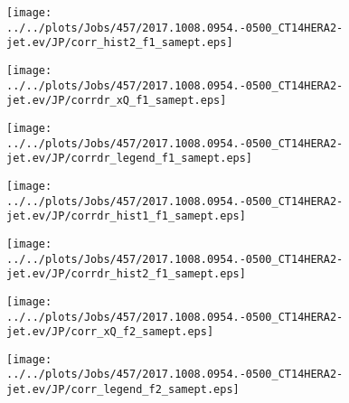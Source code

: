 \documentclass[12pt]{article}
\begin{document}
\begin{figure}
\texttt{[image: ../../plots/Jobs/457/2017.1008.0954.-0500\_CT14HERA2-jet.ev/JP/corr\_hist2\_f1\_samept.eps]}
\caption{}
\end{figure}\newpage\clearpage
\begin{figure}
\texttt{[image: ../../plots/Jobs/457/2017.1008.0954.-0500\_CT14HERA2-jet.ev/JP/corrdr\_xQ\_f1\_samept.eps]}
\caption{}
\end{figure}\newpage\clearpage
\begin{figure}
\texttt{[image: ../../plots/Jobs/457/2017.1008.0954.-0500\_CT14HERA2-jet.ev/JP/corrdr\_legend\_f1\_samept.eps]}
\caption{}
\end{figure}\newpage\clearpage
\begin{figure}
\texttt{[image: ../../plots/Jobs/457/2017.1008.0954.-0500\_CT14HERA2-jet.ev/JP/corrdr\_hist1\_f1\_samept.eps]}
\caption{}
\end{figure}\newpage\clearpage
\begin{figure}
\texttt{[image: ../../plots/Jobs/457/2017.1008.0954.-0500\_CT14HERA2-jet.ev/JP/corrdr\_hist2\_f1\_samept.eps]}
\caption{}
\end{figure}\newpage\clearpage
\begin{figure}
\texttt{[image: ../../plots/Jobs/457/2017.1008.0954.-0500\_CT14HERA2-jet.ev/JP/corr\_xQ\_f2\_samept.eps]}
\caption{}
\end{figure}\newpage\clearpage
\begin{figure}
\texttt{[image: ../../plots/Jobs/457/2017.1008.0954.-0500\_CT14HERA2-jet.ev/JP/corr\_legend\_f2\_samept.eps]}
\caption{}
\end{figure}\newpage\clearpage
\end{document}
